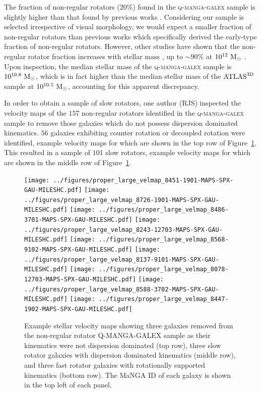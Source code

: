 \documentclass[useAMS,usenatbib]{mn2e}
\begin{document}
The fraction of non-regular rotators ($20\%$) found in the \textsc{q-manga-galex} sample is slightly higher than that found by previous works \citep[$14-17\%$ of early-types in the $\rm{ATLAS}^{\rm{3D}}$ sample; ][]{emsellem11, stott16}. Considering our sample is selected irrespective of visual morphology, we would expect a smaller fraction of non-regular rotators than previous works which specifically derived the early-type fraction of non-regular rotators. However, other studies have shown that the non-regular rotator fraction increases with stellar mass \citep{cappellari13}, up to $\sim90\%$ at $10^{12}~\rm{M}_{\odot}$ \citep{veale17}. Upon inspection, the median stellar mass of the \textsc{q-manga-galex} sample is $10^{10.8}~\rm{M}_{\odot}$, which is in fact higher than the median stellar mass of the $\rm{ATLAS}^{\rm{3D}}$ sample at $10^{10.5}~\rm{M}_{\odot}$, accounting for this apparent discrepancy.

In order to obtain a sample of slow rotators, one author (RJS) inspected the velocity maps of the $157$ non-regular rotators identified in the \textsc{q-manga-galex} sample to remove those galaxies which do not possess dispersion dominated kinematics. $56$ galaxies exhibiting  counter rotation or decoupled rotation were identified, example velocity maps for which are shown in the top row of Figure~\ref{fig:exvelmaps}. This resulted in a sample of $101$ slow rotators, example velocity maps for which are shown in the middle row of Figure~\ref{fig:exvelmaps}.  


\begin{figure}
\centering
\texttt{[image: ../figures/proper\_large\_velmap\_8451-1901-MAPS-SPX-GAU-MILESHC.pdf]}
\texttt{[image: ../figures/proper\_large\_velmap\_8726-1901-MAPS-SPX-GAU-MILESHC.pdf]}
\texttt{[image: ../figures/proper\_large\_velmap\_8486-3701-MAPS-SPX-GAU-MILESHC.pdf]}
\texttt{[image: ../figures/proper\_large\_velmap\_8243-12703-MAPS-SPX-GAU-MILESHC.pdf]}
\texttt{[image: ../figures/proper\_large\_velmap\_8568-9102-MAPS-SPX-GAU-MILESHC.pdf]}
\texttt{[image: ../figures/proper\_large\_velmap\_8137-9101-MAPS-SPX-GAU-MILESHC.pdf]}
\texttt{[image: ../figures/proper\_large\_velmap\_8078-12703-MAPS-SPX-GAU-MILESHC.pdf]}
\texttt{[image: ../figures/proper\_large\_velmap\_8588-3702-MAPS-SPX-GAU-MILESHC.pdf]}
\texttt{[image: ../figures/proper\_large\_velmap\_8447-1902-MAPS-SPX-GAU-MILESHC.pdf]}
\caption{Example stellar velocity maps showing three galaxies removed from the non-regular rotator \textsc{Q-MANGA-GALEX} sample as their kinematics were not dispersion dominated (top row), three slow rotator galaxies with dispersion dominated kinematics (middle row), and three fast rotator galaxies with rotationally supported kinematics (bottom row). The MaNGA ID of each galaxy is shown in the top left of each panel.}
\label{fig:exvelmaps}
\end{figure}  
\end{document}
